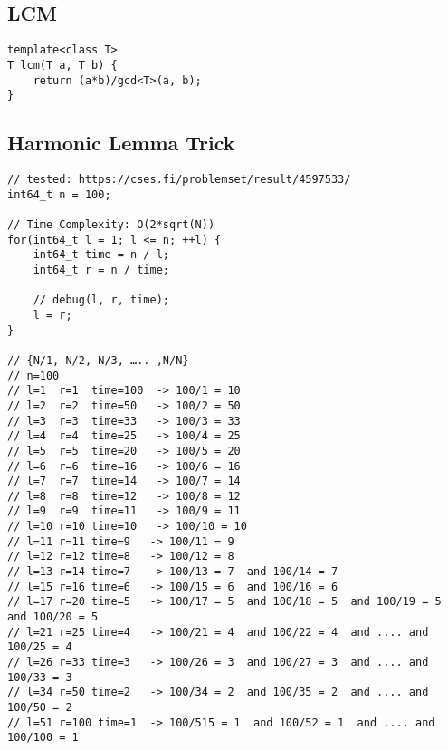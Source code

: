 \documentclass[10pt,letterpaper,twocolumn,twosided]{article}
\begin{document}
\subsection{LCM}
\begin{lstlisting}
template<class T>
T lcm(T a, T b) {  
    return (a*b)/gcd<T>(a, b);  
}
\end{lstlisting}

\subsection{Harmonic Lemma Trick}
\begin{lstlisting}
// tested: https://cses.fi/problemset/result/4597533/
int64_t n = 100;

// Time Complexity: O(2*sqrt(N))
for(int64_t l = 1; l <= n; ++l) {
    int64_t time = n / l;
    int64_t r = n / time;
    
    // debug(l, r, time);
    l = r;
}

// {N/1, N/2, N/3, ….. ,N/N}
// n=100
// l=1  r=1  time=100  -> 100/1 = 10
// l=2  r=2  time=50   -> 100/2 = 50
// l=3  r=3  time=33   -> 100/3 = 33
// l=4  r=4  time=25   -> 100/4 = 25
// l=5  r=5  time=20   -> 100/5 = 20
// l=6  r=6  time=16   -> 100/6 = 16
// l=7  r=7  time=14   -> 100/7 = 14
// l=8  r=8  time=12   -> 100/8 = 12
// l=9  r=9  time=11   -> 100/9 = 11
// l=10 r=10 time=10   -> 100/10 = 10
// l=11 r=11 time=9   -> 100/11 = 9
// l=12 r=12 time=8   -> 100/12 = 8
// l=13 r=14 time=7   -> 100/13 = 7  and 100/14 = 7
// l=15 r=16 time=6   -> 100/15 = 6  and 100/16 = 6
// l=17 r=20 time=5   -> 100/17 = 5  and 100/18 = 5  and 100/19 = 5 and 100/20 = 5
// l=21 r=25 time=4   -> 100/21 = 4  and 100/22 = 4  and .... and 100/25 = 4
// l=26 r=33 time=3   -> 100/26 = 3  and 100/27 = 3  and .... and 100/33 = 3
// l=34 r=50 time=2   -> 100/34 = 2  and 100/35 = 2  and .... and 100/50 = 2
// l=51 r=100 time=1  -> 100/515 = 1  and 100/52 = 1  and .... and 100/100 = 1
\end{lstlisting}
\end{document}

